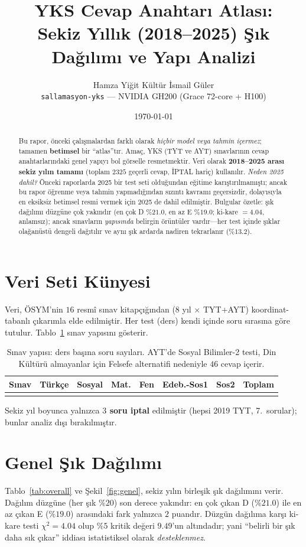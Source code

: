 \documentclass[11pt]{article}
\title{\textbf{YKS Cevap Anahtarı Atlası:\\
Sekiz Yıllık (2018--2025) Şık Dağılımı ve Yapı Analizi}}
\author{Hamza Yiğit Kültür \quad\textbullet\quad İsmail Güler\\[2pt]
\small \texttt{sallamasyon-yks} --- NVIDIA GH200 (Grace 72-core + H100)}
\date{\today}
\begin{document}
\maketitle

\begin{abstract}
\noindent
Bu rapor, önceki çalışmalardan farklı olarak \emph{hiçbir model veya tahmin
içermez}; tamamen \textbf{betimsel} bir ``atlas''tır. Amaç, YKS (TYT ve AYT)
sınavlarının cevap anahtarlarındaki genel yapıyı bol görselle resmetmektir.
Veri olarak \textbf{2018--2025 arası sekiz yılın tamamı} (toplam $2325$ geçerli
cevap, İPTAL hariç) kullanılır. \emph{Neden 2025 dahil?} Önceki raporlarda 2025
bir test seti olduğundan eğitime karıştırılmamıştı; ancak bu rapor öğrenme veya
tahmin yapmadığından sızıntı kavramı geçersizdir, dolayısıyla en eksiksiz
betimsel resmi vermek için 2025 de dahil edilmiştir. Bulgular özetle: şık
dağılımı düzgüne çok yakındır (en çok D $\%21.0$, en az E $\%19.0$; ki-kare
$=4.04$, anlamsız); ancak sınavların \emph{yapısında} belirgin örüntüler
vardır---her test içinde şıklar olağanüstü dengeli dağıtılır ve aynı şık ardarda
nadiren tekrarlanır ($\%13.2$).
\end{abstract}

\section{Veri Seti Künyesi}
Veri, ÖSYM'nin $16$ resmî sınav kitapçığından ($8$ yıl $\times$ TYT+AYT)
koordinat-tabanlı çıkarımla elde edilmiştir. Her test (ders) kendi içinde soru
sırasına göre tutulur. Tablo~\ref{tab:kunye} sınav yapısını gösterir.

\begin{table}[H]
\centering
\caption{Sınav yapısı: ders başına soru sayıları. AYT'de Sosyal Bilimler-2
testi, Din Kültürü almayanlar için Felsefe alternatifi nedeniyle $46$ cevap
içerir.}
\label{tab:kunye}
\begin{tabular}{lccccccc}
\toprule
Sınav & Türkçe & Sosyal & Mat. & Fen & Edeb.-Sos1 & Sos2 & Toplam \\
\midrule

\\
\bottomrule
\end{tabular}
\end{table}
\noindent Sekiz yıl boyunca yalnızca \textbf{$3$ soru iptal} edilmiştir (hepsi
2019 TYT, 7.\ sorular); bunlar analiz dışı bırakılmıştır.

\section{Genel Şık Dağılımı}
Tablo~\ref{tab:overall} ve Şekil~\ref{fig:genel}, sekiz yılın birleşik şık
dağılımını verir. Dağılım düzgüne (her şık $\%20$) son derece yakındır:
en çok çıkan D ($\%21.0$) ile en az çıkan E ($\%19.0$) arasındaki fark yalnızca
$2$ puandır. Düzgün dağılıma karşı ki-kare testi $\chi^2=4.04$ olup $\%5$ kritik
değeri $9.49$'un altındadır; yani ``belirli bir şık daha sık çıkar'' iddiası
istatistiksel olarak \emph{desteklenmez}.
\end{document}
